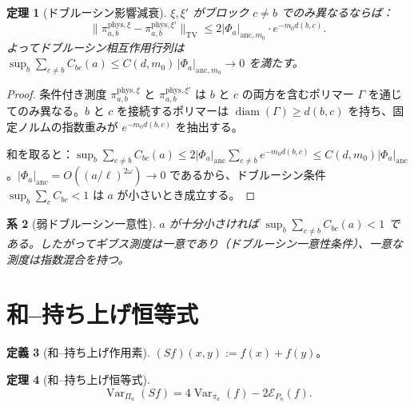\documentclass[12pt]{article}
\theoremstyle{plain}
\newtheorem{theorem}{定理}[section]
\newtheorem{corollary}[theorem]{系}
\theoremstyle{definition}
\newtheorem{definition}[theorem]{定義}
\numberwithin{equation}{section}
\newcommand{\Var}{\operatorname{Var}}
\newcommand{\diam}{\operatorname{diam}}
\newcommand{\phys}{\mathrm{phys}}
\begin{document}
\begin{theorem}[ドブルーシン影響減衰]\label{thm:dobrushin}
$\xi,\xi'$ がブロック $c\neq b$ でのみ異なるならば：
\begin{equation}
\|\pi_{a,b}^{\phys,\xi}-\pi_{a,b}^{\phys,\xi'}\|_{\mathrm{TV}} \leq 2|\Phi_a|_{\mathrm{anc},m_0}\cdot e^{-m_0 d(b,c)}.
\end{equation}
よってドブルーシン相互作用行列は $\sup_b\sum_{c\neq b}C_{bc}(a)\leq C(d,m_0)\,|\Phi_a|_{\mathrm{anc},m_0}\to 0$ を満たす。
\end{theorem}

\begin{proof}
条件付き測度 $\pi_{a,b}^{\phys,\xi}$ と $\pi_{a,b}^{\phys,\xi'}$ は $b$ と $c$ の両方を含むポリマー $\Gamma$ を通じてのみ異なる。$b$ と $c$ を接続するポリマーは $\diam(\Gamma)\geq d(b,c)$ を持ち、固定ノルムの指数重みが $e^{-m_0 d(b,c)}$ を抽出する。

和を取ると：$\sup_b\sum_{c\neq b}C_{bc}(a)\leq 2|\Phi_a|_{\mathrm{anc}}\sum_{c\neq b}e^{-m_0 d(b,c)}\leq C(d,m_0)|\Phi_a|_{\mathrm{anc}}$。$|\Phi_a|_{\mathrm{anc}}=O((a/\ell)^{2\omega})\to 0$ であるから、ドブルーシン条件 $\sup_b\sum_c C_{bc}<1$ は $a$ が小さいとき成立する。
\end{proof}

\begin{corollary}[弱ドブルーシン一意性]\label{cor:dobrushin}
$a$ が十分小さければ $\sup_b\sum_{c\neq b}C_{bc}(a)<1$ である。したがってギブス測度は一意であり（ドブルーシン一意性条件）、一意な測度は指数混合を持つ。
\end{corollary}

\section{和--持ち上げ恒等式}\label{sec:sumlift}

\begin{definition}[和--持ち上げ作用素]
$(Sf)(x,y):=f(x)+f(y)$。
\end{definition}

\begin{theorem}[和--持ち上げ恒等式]\label{thm:sumlift}
\begin{equation}
\boxed{\Var_{\Pi_a}(Sf) = 4\Var_{\pi_a}(f) - 2\mathcal{E}_{P_a}(f).}
\end{equation}
\end{theorem}
\end{document}
